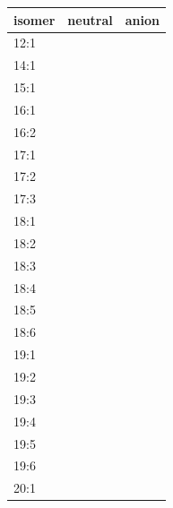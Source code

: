 \begin{figure}[htbp]
    \centering
	\begin{tabular}{lp{3cm}|p{3cm}}\toprule
		isomer  & \multicolumn{1}{c}{neutral} & \multicolumn{1}{c}{anion} \\ \midrule
		12:1    & \cellcolor{myorange}        & \cellcolor{myorange}      \\
		14:1    & \cellcolor{mygreen}         & \cellcolor{mygreen}       \\
		15:1    & \cellcolor{mygreen}         & \cellcolor{mygreen}       \\
		16:1    & \cellcolor{mygreen}         & \cellcolor{mygreen}       \\
		16:2    & \cellcolor{mygreen}         & \cellcolor{mygreen}       \\
		17:1    & \cellcolor{myorange}        & \cellcolor{mygreen}       \\
		17:2    & \cellcolor{mygreen}         & \cellcolor{mygreen}       \\
		17:3    & \cellcolor{mygreen}         & \cellcolor{mygreen}       \\
		18:1    & \cellcolor{mygreen}         & \cellcolor{mygreen}       \\
		18:2    & \cellcolor{mygreen}         & \cellcolor{mygreen}       \\
		18:3    & \cellcolor{mygreen}         & \cellcolor{myorange}      \\
		18:4    & \cellcolor{mygreen}         & \cellcolor{mygreen}       \\
		18:5    & \cellcolor{mygreen}         & \cellcolor{mygreen}       \\
		18:6    & \cellcolor{mygreen}         & \cellcolor{mygreen}       \\
		19:1    & \cellcolor{mygreen}         & \cellcolor{myorange}      \\
		19:2    & \cellcolor{mygreen}         & \cellcolor{myorange}      \\
		19:3    & \cellcolor{mygreen}         & \cellcolor{mygreen}       \\
		19:4    & \cellcolor{mygreen}         & \cellcolor{myorange}      \\
		19:5    & \cellcolor{mygreen}         & \cellcolor{myorange}      \\
		19:6    & \cellcolor{mygreen}         & \cellcolor{mygreen}       \\
		20:1    & \cellcolor{myorange}        & \cellcolor{myorange}      \\

\end{tabular}
\end{figure}
